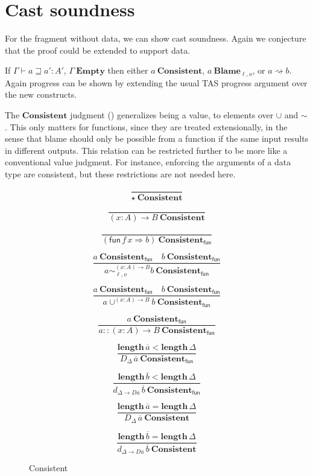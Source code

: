 \section{Cast soundness}

For the fragment without data, we can show cast soundness.
Again we conjecture that the proof could be extended to support data.
 
If $\varGamma\vdash a\sqsupseteq a':A'$, $\varGamma\ \mathbf{Empty}$ then either $a\ \mathbf{Consistent}$, $a\ \mathbf{Blame}_{\ell,o}$, or $a\rightsquigarrow b$.
Again progress can be shown by extending the usual \ac{TAS} progress argument over the new constructs.

The $\mathbf{Consistent}$ judgment () generalizes being a value, to elements over $\cup$ and $\sim$.
This only matters for functions, since they are treated extensionally, in the sense that blame should only be possible from a function if the same input results in different outputs.
This relation can be restricted further to be more like a conventional value judgment.
For instance, enforcing the arguments of a data type are consistent, but these restrictions are not needed here.

\begin{figure}
\[
\frac{\ }{\star\ \mathbf{Consistent}}
\]

\[
\frac{\ }{\left(x:A\right)\rightarrow B\ \mathbf{Consistent}}
\]

\[
\frac{\ }{\left(\mathsf{fun}\,f\,x\Rightarrow b\right)\ \mathbf{Consistent_{\mathsf{fun}}}}
\]

\[
\frac{
  a\ \mathbf{Consistent_{\mathsf{fun}}}\quad b\ \mathbf{Consistent_{\mathsf{fun}}}
}{
  a\sim_{\ell,o}^{\left(x:A\right)\rightarrow B}b\ \mathbf{Consistent_{\mathsf{fun}}}}
\]

\[
\frac{
  a\ \mathbf{Consistent_{\mathsf{fun}}}\quad b\ \mathbf{Consistent_{\mathsf{fun}}}
}{
  a\cup^{\left(x:A\right)\rightarrow B}b\ \mathbf{Consistent_{\mathsf{fun}}}
}
\]

\[
\frac{
  a\ \mathbf{Consistent_{\mathsf{fun}}}
}{
  a::\left(x:A\right)\rightarrow B\ \mathbf{Consistent_{\mathsf{fun}}}}
\]

\[
\frac{
  \mathbf{length}\,\overline{a} < \mathbf{length}\,\Delta
}{
  D_{\Delta}\,\overline{a}\ \mathbf{Consistent_{\mathsf{fun}}}
}
\]

\[
\frac{
  \mathbf{length}\,\overline{b} < \mathbf{length}\,\Delta
}{
  d_{\Delta\rightarrow D\overline{a}}\,\overline{b}\ \mathbf{Consistent_{\mathsf{fun}}}
}
\]

\[
\frac{
  \mathbf{length}\,\overline{a} = \mathbf{length}\,\Delta
}{
  D_{\Delta}\,\overline{a}\ \mathbf{Consistent}
}
\]

\[
\frac{
  \mathbf{length}\,\overline{b} = \mathbf{length}\,\Delta
}{
  d_{\Delta\rightarrow D\overline{a}}\,\overline{b}\ \mathbf{Consistent}
}
\]

\caption{Consistent}
\label{fig:cast-data-val}
\end{figure}


